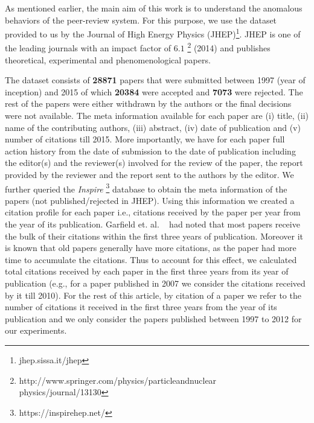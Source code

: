 As mentioned earlier, the main aim of this work is to understand the anomalous behaviors of the peer-review system. For this purpose, we use the dataset provided to us by the Journal of High Energy Physics (JHEP)\footnote{jhep.sissa.it/jhep}. JHEP is one of the leading journals with an impact factor of $6.1$ \footnote{http://www.springer.com/physics/particleandnuclear \\ physics/journal/13130} (2014) and publishes theoretical, experimental and phenomenological papers. 

The dataset consists of {\bf 28871} papers that were submitted between 1997 (year of inception) and 2015 of which {\bf 20384} were accepted and {\bf 7073} were rejected. The rest of the papers were either withdrawn by the authors or the final decisions were not available. 
The meta information available for each paper are (i) title, (ii) name of the contributing authors, (iii) abstract, (iv) date of publication and (v) number of citations till 2015. More importantly, we have for each paper full action history from the date of submission to the date of publication including the editor(s) and the reviewer(s) involved for the review of the paper, the report provided by the reviewer and the report sent to the authors by the editor. 
We further queried the {\em Inspire} \footnote{https://inspirehep.net/} database to obtain the meta information of the papers (not published/rejected in JHEP). Using this information we created a citation profile for each paper i.e., citations received by the paper per year from the year of its publication. Garfield et. al. ~\cite{garfield1999journal} had noted that most papers receive the bulk of their citations within the first three years of publication. Moreover it is known that old papers generally have more citations, as the paper had more time to accumulate the citations. Thus to account for this effect,  we  calculated total citations received by each paper in the first three years from its year of publication (e.g., for a paper published in 2007 we consider the citations received by it till 2010). For the rest of this article, by citation of a paper we refer to the number of citations it received in the first three years from the year of its publication and we only consider the papers published between 1997 to 2012 for our experiments. 
